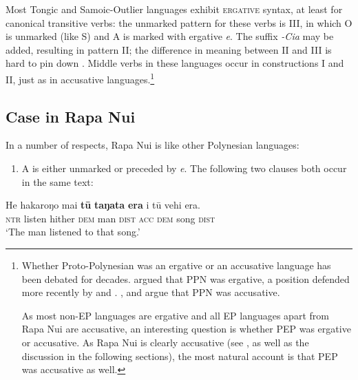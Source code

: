 Most Tongic and Samoic-Outlier languages exhibit \textsc{ergative} syntax, at least for canonical transitive verbs: the unmarked pattern for these verbs is III, in which O is unmarked (like S) and A is marked with ergative \textit{e}. The suffix \textit{-Cia} may be added, resulting in pattern II; the difference in meaning between II and III is hard to pin down \citep[71]{Clark1976}. Middle verbs in these languages occur in constructions I and II, just as in accusative languages.\footnote{\label{fn:385}Whether Proto-Polynesian was an ergative or an accusative language has been debated for decades. \citet{Clark1976} argued that PPN was ergative, a position defended more recently by \citet{Kikusawa2002,Kikusawa2003} and \citet{Otsuka2011}. \citet{Hohepa1969Drift}, \citet{Chung1978} and \citet{Ball2007} argue that PPN was accusative.

As most non-EP languages are ergative and all EP languages apart from Rapa Nui are accusative, an interesting question is whether PEP was ergative or accusative. As Rapa Nui is clearly accusative (see \citealt[85]{WeberN2003}, as well as the discussion in the following sections), the most natural account is that PEP was accusative as well.} 

\subsection{Case in Rapa Nui}\label{sec:8.2.2}
In a number of respects, Rapa Nui is like other Polynesian languages: 

\begin{enumerate}
\item 
A is either unmarked or preceded by \textit{e}. The following two clauses both occur in the same text:
\end{enumerate}

\ea\label{ex:8.2}
\gll He hakaroŋo mai \textbf{tū} \textbf{taŋata} \textbf{era} i tū vehi era.\\
\textsc{ntr} listen hither \textsc{dem} man \textsc{dist} \textsc{acc} \textsc{dem} song \textsc{dist}\\

\glt 
‘The man listened to that song.’ \textstyleExampleref{[R310.189]} 
\z

